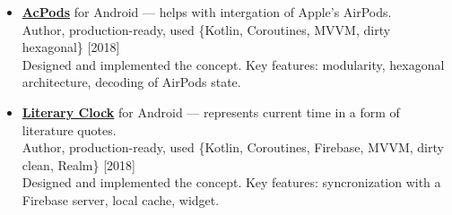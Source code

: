\documentclass[a4paper]{article}
\begin{document}
\begin{itemize}
		\item \href{https://github.com/AChep/acpods}{\textbf{AcPods}} for Android --- helps with intergation of Apple's AirPods. \\[0.2em]
		{\footnotesize Author, production-ready, used \{Kotlin, Coroutines, MVVM, dirty hexagonal\} \hfill [2018]} \\[0.2em]
		Designed and implemented the concept. Key features: modularity, hexagonal architecture, decoding of AirPods state. 

		\item \href{https://github.com/AChep/literaryclock}{\textbf{Literary Clock}} for Android --- represents current time in a form of literature quotes. \\[0.2em]
		{\footnotesize Author, production-ready, used \{Kotlin, Coroutines, Firebase, MVVM, dirty clean, Realm\} \hfill [2018]} \\[0.2em]
		Designed and implemented the concept. Key features: syncronization with a Firebase server, local cache, widget.     
	\end{itemize}
\end{document}
